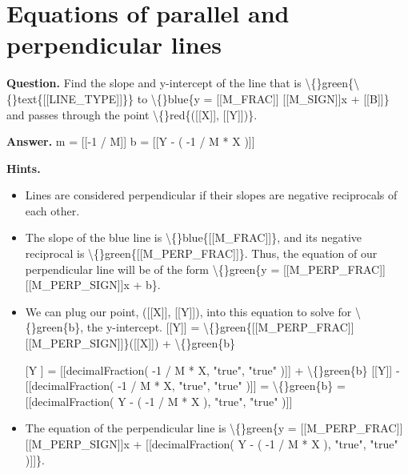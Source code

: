 \documentclass{article}
\begin{document}
\section*{Equations of parallel and perpendicular lines}
\textbf{Question.} Find the slope and y-intercept of the line that is \textbackslash\{\}green\{\textbackslash\{\}text\{[[LINE\_TYPE]]\}\} to \textbackslash\{\}blue\{y =
                        [[M\_FRAC]]
                        [[M\_SIGN]]x
                        + [[B]]\} and passes through the point \textbackslash\{\}red\{([[X]], [[Y]])\}.

\textbf{Answer.} m = [[-1 / M]]
                    b = [[Y - ( -1 / M * X )]]

\textbf{Hints.}
\begin{itemize}
  \item Lines are considered perpendicular if their slopes are negative reciprocals of each other.
  \item The slope of the blue line is \textbackslash\{\}blue\{[[M\_FRAC]]\}, and its negative reciprocal is \textbackslash\{\}green\{[[M\_PERP\_FRAC]]\}.
                        Thus, the equation of our perpendicular line will be of the form \textbackslash\{\}green\{y = [[M\_PERP\_FRAC]][[M\_PERP\_SIGN]]x + b\}.
  \item We can plug our point, ([[X]], [[Y]]), into this equation to solve for \textbackslash\{\}green\{b\}, the y-intercept.
                        [[Y]] = \textbackslash\{\}green\{[[M\_PERP\_FRAC]][[M\_PERP\_SIGN]]\}([[X]]) + \textbackslash\{\}green\{b\}
  \item [[Y]] = [[decimalFraction( -1 / M * X, "true", "true" )]] + \textbackslash\{\}green\{b\}
                        [[Y]] - [[decimalFraction( -1 / M * X, "true", "true" )]] = \textbackslash\{\}green\{b\} = [[decimalFraction( Y - ( -1 / M * X ), "true", "true" )]]
  \item The equation of the perpendicular line is \textbackslash\{\}green\{y =
                            [[M\_PERP\_FRAC]]
                            [[M\_PERP\_SIGN]]x
                             + [[decimalFraction( Y - ( -1 / M * X ), "true", "true" )]]\}.
                        

\end{itemize}
\end{document}
